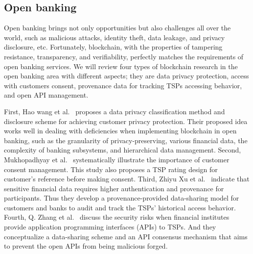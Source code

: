 \subsection{Open banking}
Open banking brings not only opportunities but also challenges all over the world, such as malicious attacks, identity theft, data leakage, and privacy disclosure, etc. Fortunately, blockchain, with the properties of tampering resistance, transparency, and verifiability, perfectly matches the requirements of open banking services. We will review four types of blockchain research in the open banking area with different aspects; they are data privacy protection, access with customers consent, provenance data for tracking TSPs accessing behavior, and open API management.\par

First, Hao wang et al.~\cite{wang2020blockchain} proposes a data privacy classification method and disclosure scheme for achieving customer privacy protection. Their proposed idea works well in dealing with deficiencies when implementing blockchain in open banking, such as the granularity of privacy-preserving, various financial data, the complexity of banking subsystems, and hierarchical data management. Second, Mukhopadhyay et al.~\cite{mukhopadhyay2021blockchain} systematically illustrate the importance of customer consent management. This study also proposes a TSP rating design for customer's reference before making consent. Third, Zhiyu Xu et al.~\cite{xu2020ppm} indicate that sensitive financial data requires higher authentication and provenance for participants. Thus they develop a provenance-provided data-sharing model for customers and banks to audit and track the TSPs' historical access behavior. Fourth, Q. Zhang et al.~\cite{zhang2019obbc} discuss the security risks when financial institutes provide application programming interfaces (APIs) to TSPs. And they conceptualize a data-sharing scheme and an API consensus mechanism that aims to prevent the open APIs from being malicious forged.
